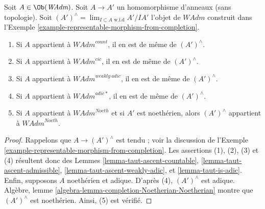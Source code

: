 \begin{lemma}
\label{lemma-completion-in-sub}
Soit $A \in \Ob(\textit{WAdm})$. Soit $A \to A'$ un homomorphisme
d'anneaux (sans topologie). Soit $(A')^\wedge = \lim_{I \subset A\text{ w.i.d}} A'/IA'$
l'objet de $\textit{WAdm}$ construit dans
l'Exemple \ref{example-representable-morphism-from-completion}.
\begin{enumerate}
\item Si $A$ appartient à $\textit{WAdm}^{count}$, il en est de même de $(A')^\wedge$.
\item Si $A$ appartient à $\textit{WAdm}^{cic}$, il en est de même de $(A')^\wedge$.
\item Si $A$ appartient à $\textit{WAdm}^{weakly\ adic}$, il en est de même de $(A')^\wedge$.
\item Si $A$ appartient à $\textit{WAdm}^{adic*}$, il en est de même de $(A')^\wedge$.
\item Si $A$ appartient à $\textit{WAdm}^{Noeth}$ et si $A'$ est noethérien, alors
$(A')^\wedge$ appartient à $\textit{WAdm}^{Noeth}$.
\end{enumerate}
\end{lemma}

\begin{proof}
Rappelons que $A \to (A')^\wedge$ est tendu ; voir la discussion de
l'Exemple \ref{example-representable-morphism-from-completion}.
Les assertions (1), (2), (3) et (4) résultent donc des Lemmes
\ref{lemma-taut-ascent-countable},
\ref{lemma-taut-ascent-admissible},
\ref{lemma-taut-ascent-weakly-adic}, et
\ref{lemma-taut-is-adic}.
Enfin, supposons $A$ noethérien et adique.
D'après (4), $(A')^\wedge$ est adique.
Algèbre, lemme \ref{algebra-lemma-completion-Noetherian-Noetherian}
montre que $(A')^\wedge$ est noethérien. Ainsi, (5) est vérifié.
\end{proof}

